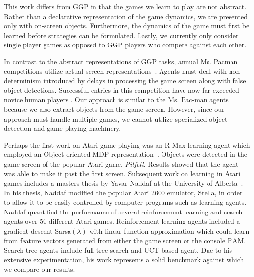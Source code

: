 \documentclass{acm_proc_article-sp}
\begin{document}
This work differs from GGP in that the games we learn to play are not abstract. Rather than a declarative representation of the game dynamics, we are presented only with on-screen objects. Furthermore, the dynamics of the game must first be learned before strategies can be formulated. Lastly, we currently only consider single player games as opposed to GGP players who compete against each other.

In contrast to the abstract representations of GGP tasks, annual Ms. Pacman competitions utilize actual screen representations~\cite{pacmancompetition}. Agents must deal with non-determinism introduced by delays in processing the game screen along with false object detections. Successful entries in this competition have now far exceeded novice human players \cite{sigevolution2007}. Our approach is similar to the Ms. Pac-man agents because we also extract objects from the game screen. However, since our approach must handle multiple games, we cannot utilize specialized object detection and game playing machinery.

Perhaps the first work on Atari game playing was an R-Max learning agent which employed an Object-oriented MDP representation~\cite{duik08}. Objects were detected in the game screen of the popular Atari game, \emph{Pitfall}. Results showed that the agent was able to make it past the first screen. Subsequent work on learning in Atari games includes a masters thesis by Yavar Naddaf at the University of Alberta~\cite{naddaf10}. In his thesis, Naddaf modified the popular Atari 2600 emulator, Stella, in order to allow it to be easily controlled by computer programs such as learning agents. Naddaf quantified the performance of several reinforcement learning and search agents over 50 different Atari games. Reinforcement learning agents included a gradient descent Sarsa$(\lambda)$ with linear function approximation which could learn from feature vectors generated from either the game screen or the console RAM. Search tree agents include full tree search and UCT based agent. Due to his extensive experimentation, his work represents a solid benchmark against which we compare our results.
\end{document}
